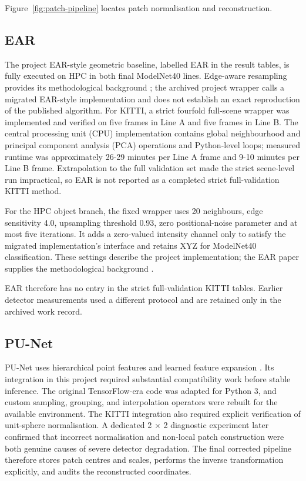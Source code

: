 Figure~\ref{fig:patch-pipeline} locates patch normalisation and reconstruction.

\subsection{EAR}
\label{sec:fc-4-5-3}

The project EAR-style geometric baseline, labelled EAR in the result tables, is fully executed on HPC in both final ModelNet40 lines. Edge-aware resampling provides its methodological background \cite{huang2013ear}; the archived project wrapper calls a migrated EAR-style implementation and does not establish an exact reproduction of the published algorithm. For KITTI, a strict fourfold full-scene wrapper was implemented and verified on five frames in Line A and five frames in Line B. The central processing unit (CPU) implementation contains global neighbourhood and principal component analysis (PCA) operations and Python-level loops; measured runtime was approximately 26-29 minutes per Line A frame and 9-10 minutes per Line B frame. Extrapolation to the full validation set made the strict scene-level run impractical, so EAR is not reported as a completed strict full-validation KITTI method.

For the HPC object branch, the fixed wrapper uses 20 neighbours,
edge sensitivity 4.0, upsampling threshold 0.93, zero positional-noise
parameter and at most five iterations. It adds a zero-valued intensity
channel only to satisfy the migrated implementation's interface and
retains XYZ for ModelNet40 classification. These settings describe the
project implementation; the EAR paper supplies the methodological
background \cite{huang2013ear}.

EAR therefore has no entry in the strict full-validation KITTI tables. Earlier detector measurements used a different protocol and are retained only in the archived work record.

\subsection{PU-Net}
\label{sec:fc-4-5-4}

PU-Net uses hierarchical point features and learned feature expansion \cite{yu2018punet}. Its integration in this project required substantial compatibility work before stable inference. The original TensorFlow-era code was adapted for Python 3, and custom sampling, grouping, and interpolation operators were rebuilt for the available environment. The KITTI integration also required explicit verification of unit-sphere normalisation. A dedicated 2 \ensuremath{\times}  2 diagnostic experiment later confirmed that incorrect normalisation and non-local patch construction were both genuine causes of severe detector degradation. The final corrected pipeline therefore stores patch centres and scales, performs the inverse transformation explicitly, and audits the reconstructed coordinates.

